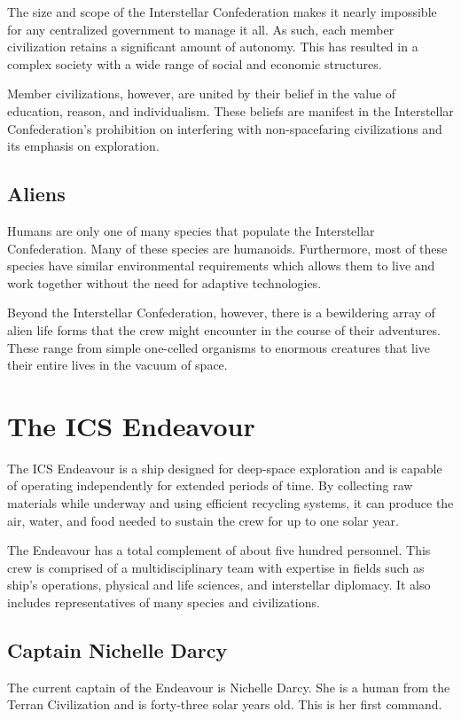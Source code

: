 \documentclass[11pt, a5paper, parskip=half-, DIV=12]{scrartcl}
\begin{document}
The size and scope of the Interstellar Confederation makes it nearly impossible for any centralized government to manage it all. As such, each member civilization retains a significant amount of autonomy. This has resulted in a complex society with a wide range of social and economic structures.

Member civilizations, however, are united by their belief in the value of education, reason, and individualism. These beliefs are manifest in the Interstellar Confederation's prohibition on interfering with non-spacefaring civilizations and its emphasis on exploration.

\subsection*{Aliens}
Humans are only one of many species that populate the Interstellar Confederation. Many of these species are humanoids. Furthermore, most of these species have similar environmental requirements which allows them to live and work together without the need for adaptive technologies.

Beyond the Interstellar Confederation, however, there is a bewildering array of alien life forms that the crew might encounter in the course of their adventures. These range from simple one-celled organisms to enormous creatures that live their entire lives in the vacuum of space.

\newpage

\section*{The ICS Endeavour}
The ICS Endeavour is a ship designed for deep-space exploration and is capable of operating independently for extended periods of time. By collecting raw materials while underway and using efficient recycling systems, it can produce the air, water, and food needed to sustain the crew for up to one solar year.

The Endeavour has a total complement of about five hundred personnel. This crew is comprised of a multidisciplinary team with expertise in fields such as ship's operations, physical and life sciences, and interstellar diplomacy. It also includes representatives of many species and civilizations.

\subsection*{Captain Nichelle Darcy}
The current captain of the Endeavour is Nichelle Darcy. She is a human from the Terran Civilization and is forty-three solar years old. This is her first command.
\end{document}
